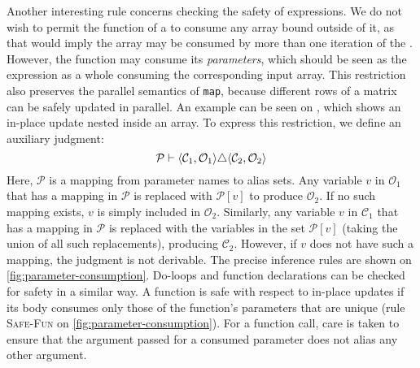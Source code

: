 Another interesting rule concerns checking the safety of 
expressions.  We do not wish to permit the function of a  to
consume any array bound outside of it, as that would imply the array
may be consumed by more than one iteration of the .  However,
the function may consume its \textit{parameters}, which should be seen
as the  expression as a whole consuming the corresponding
input array.  This restriction also preserves the parallel semantics
of \lstinline{map}, because different rows of a matrix can be safely
updated in parallel.  An example can be seen on
, which shows an in-place update nested
inside an array.  To express this restriction, we define an auxiliary
judgment:
\[
\mathcal{P} \vdash \langle\mathcal{C}_{1},\mathcal{O}_{1}\rangle \triangle \langle\mathcal{C}_{2},\mathcal{O}_{2}\rangle
\]
Here, $\mathcal{P}$ is a mapping from parameter names to alias sets.
Any variable $v$ in $\mathcal{O}_{1}$ that has a mapping in
$\mathcal{P}$ is replaced with $\mathcal{P}[v]$ to produce
$\mathcal{O}_{2}$.  If no such mapping exists, $v$ is simply included
in $\mathcal{O}_{2}$.  Similarly, any variable $v$ in
$\mathcal{C}_{1}$ that has a mapping in $\mathcal{P}$ is replaced with
the variables in the set $\mathcal{P}[v]$ (taking the union of all
such replacements), producing $\mathcal{C}_{2}$.  However, if $v$ does
not have such a mapping, the judgment is not derivable.
%
The precise inference rules are shown on
\cref{fig:parameter-consumption}.
%
Do-loops and function declarations can be checked for safety in a
similar way.  A function is safe with respect to in-place updates if
its body consumes only those of the function's parameters that are
unique (rule \textsc{Safe-Fun} on \cref{fig:parameter-consumption}).
For a function call, care is taken to ensure that the argument passed
for a consumed parameter does not alias any other argument.


